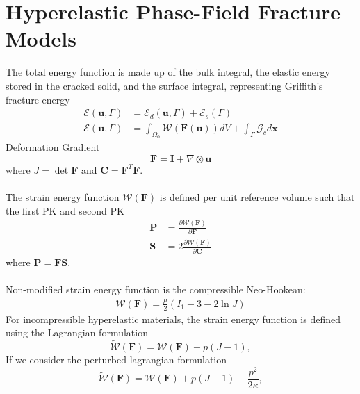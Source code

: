 \documentclass[12pt,3p]{article}
\numberwithin{equation}{section}
\begin{document}
\section{Hyperelastic Phase-Field Fracture Models}
The total energy function is made up of the bulk integral, the elastic energy stored in the cracked solid, and the surface integral, representing Griffith's fracture energy
\begin{align}
\mathcal{E}(\boldsymbol{u}, \Gamma) &= \mathcal{E}_{d}(\boldsymbol{u}, \Gamma)+\mathcal{E}_{s} (\Gamma) \\
\mathcal{E}(\boldsymbol{u}, \Gamma) &= \int_{\Omega_0} \mathcal{W} ( \mathbf{F} (\mathbf{u}) )dV + \int_{\Gamma} \mathcal{G}_c d \mathbf{x}
\end{align}
Deformation Gradient 
\begin{equation}\label{EqDefGrad}
\mathbf{F}=\mathbf{I}+\nabla\otimes\bm{u}
\end{equation}
where $J=\det \mathbf{F}$ and $\mathbf{C}=\mathbf{F}^T\mathbf{F}$. \\ \\
The strain energy function $\mathcal{W}(\mathbf{F})$ is defined per unit reference volume such that the first PK and second PK
\begin{subequations}\label{EqPK}
\begin{align}
\mathbf{P} &= \frac{\partial \mathcal{W}(\mathbf{F})}{\partial \mathbf{F}} \\
\mathbf{S} &= 2 \frac{\partial \mathcal{W}(\mathbf{F})}{\partial \mathbf{C}}
\end{align}
\end{subequations}
where $\mathbf{P}=\mathbf{F}\mathbf{S}$. \\ \\
Non-modified strain energy function is the compressible Neo-Hookean:
\begin{align}\label{StrainEnergyNH}
\mathcal{W}(\mathbf{F}) = \frac{\mu}{2} (I_1 - 3 - 2 \ln J)
\end{align}
For incompressible hyperelastic materials, the strain energy function  is defined using the Lagrangian formulation 
\begin{equation}\label{EqEnergyIncompressible}
\widetilde{\mathcal{W}}(\mathbf{F}) = \mathcal{W}(\mathbf{F}) + p\left(J-1\right),
\end{equation}
If we consider the perturbed lagrangian formulation 
\begin{equation}\label{EqPLagrangian}
\widetilde{\mathcal{W}}(\mathbf{F}) = \mathcal{W}(\mathbf{F}) + p\left(J-1\right) - \frac{p^2}{2 \kappa}, 
\end{equation}
\end{document}
